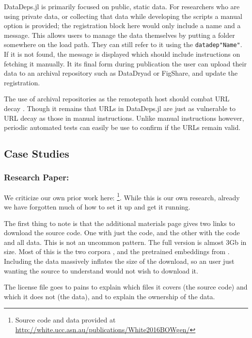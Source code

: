 \documentclass[twoside,11pt]{article}\usepackage{jmlr2e}
\newcommand{\datadep}[1]{\texttt{datadep"{}#1"{}}}
\begin{document}
DataDeps.jl is primarily focused on public, static data.
For researchers who are using private data, or collecting that data while developing the scripts a manual option is provided; the registration block here would only include a name and a message. This allows users to manage the data themselves by putting a folder somewhere on the load path. They can still refer to it using the \datadep{Name}. If it is not found, the message is displayed which should include instructions on fetching it manually.
It its final form during publication the user can upload their data to an archival repository such as DataDryad or FigShare, and update the registration.

The use of archival repositories as the remotepath host should combat URL decay \citep{wren2008url}. Though it remains that URLs in DataDeps.jl are just as vulnerable to URL decay as those in manual instructions.
Unlike manual instructions however, periodic automated tests can easily be use to confirm if the URLs remain valid.




\subsection{Case Studies}\label{sec:case-studies}
\subsubsection{Research Paper: \citet{White2015BOWgen}}
We criticize our own prior work here: \citet{White2015BOWgen} \footnote{Source code and data provided at \url{http://white.ucc.asn.au/publications/White2016BOWgen/}}.
While this is our own research, already we have forgotten much of how to set it up and get it running.

The first thing to note is that the additional materials page gives two links to download the source code.
One with just the code, and the other with the code and all data.
This is not an uncommon pattern.
The full version is almost 3Gb in size.
Most of this is the two corpora \citep{francis1979brown,moviebook}, and the pretrained embeddings from \citet{pennington2014glove}.
Including the data massively inflates the size of the download, so an user just wanting the source to understand would not wish to download it.

The license file goes to pains to explain which files it covers (the source code) and which it does not (the data), and to explain the ownership of the data.
\end{document}
